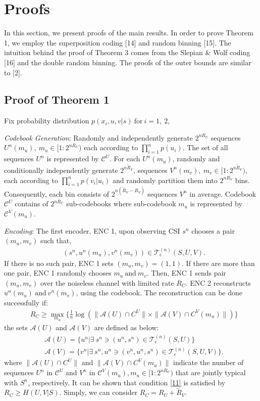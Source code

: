 \documentclass[conference,8pt]{IEEEtran}
\begin{document}
{{\section{Proofs}{
In this section, we present proofs of the main results. In order to prove Theorem 1, we employ the superposition coding [14] and random binning [15]. The intuition behind the proof of Theorem 3 comes from the Slepian \& Wolf coding [16] and the double random binning. The proofs of the outer bounds are similar to [2]. 

\subsection{Proof of Theorem 1}\label{sec:sec51}{
Fix probability distribution $p(x_{i},u,v|s) \ \text{for} \ i=1, \ 2$,

\emph{Codebook Generation}: Randomly and independently generate $2^{n{R_U}}$ sequences ${U^n}(m_u), \ {m_u \in [1:2^{n{R_U}}})$ each according to $\prod_{i=1}^n p(u_i)$. The set of all sequences $U^n$ is represented by $\mathcal{C}^U$. For each $U^n(m_u)$, randomly and conditionally independently generate $2^{n{\tilde{R}_V}}$, sequences $V^{n}(m_v), \ m_v \in [1:2^{n{\tilde{R}_V}})$, each according to $\prod_{i=1}^n p(v_i|u_i)$ and randomly partition them into $2^{n{R_V}}$ bins. Consequently, each bin consists of $2^{n({\tilde{R}_V - R_V})}$ sequences $V^n$ in average. Codebook $\mathcal{C}^U$ contains of $2^{nR_U}$ sub-codebooks where sub-codebook $m_u$ is represented by $\mathcal{C}^V(m_u)$.


\emph{Encoding}: The first encoder, ENC 1, upon observing CSI $s^n$ chooses a pair $(m_u,m_v)$ such that,
\begin{align}
&(s^n,u^n(m_u),v^n(m_v)) \in \mathcal{T}^{(n)}_{\epsilon}(S,U,V).
\end{align}
If there is no such pair, ENC 1 sets $(m_u,m_v)=(1,1)$. If there are more than one pair, ENC 1 randomly chooses $m_u \ \text{and} \ m_v$. Then, ENC 1 sends pair $(m_u ,m_v)$ over the noiseless channel with limited rate $R_C$. ENC 2 reconstructs $u^n(m_u) \ \text{and} \  v^n(m_v)$, using the codebook. The reconstruction can be done successfully if:
\begin{align}
&R_C \geq \max_{m_u} \{ \frac{1}{n} \log ( \parallel \mathcal{A}(U) \cap C^U \parallel \times \parallel \mathcal{A}(V) \cap C^V({m_u}) \parallel) \} \label{11}
\end{align}
the sets $\mathcal{A}(U)$ and $\mathcal{A}(V)$ are defined as below:
\begin{align}
&\mathcal{A}(U)= \{ u^n | \exists \ s^n \ni (u^n,s^n) \in \mathcal{T}^{(n)}_{\epsilon}(S,U) \} \nonumber \\
&\mathcal{A}(V)= \{ v^n | \exists \ s^n,u^n \ni (v^n,u^n,s^n) \in \mathcal{T}^{(n)}_{\epsilon}(S,U,V) \}. \nonumber
\end{align}where $\parallel \mathcal{A}(U) \cap C^U \parallel$ and $\parallel \mathcal{A}(V) \cap C^V({m_u}) \parallel$ indicate the number of sequences $U^n$ in $\mathcal{C}^U$ and $V^n$ in $\mathcal{C}^V(m_u), m_u \in {[1:2^{nR_U})}$ that are jointly typical with $S^n$, respectively. It can be shown that condition \eqref{11} is satisfied by $R_C \geq H(U,V|S)$. Simply, we can consider $R_C= R_U+\tilde{R}_V$.

}}}}
\end{document}
